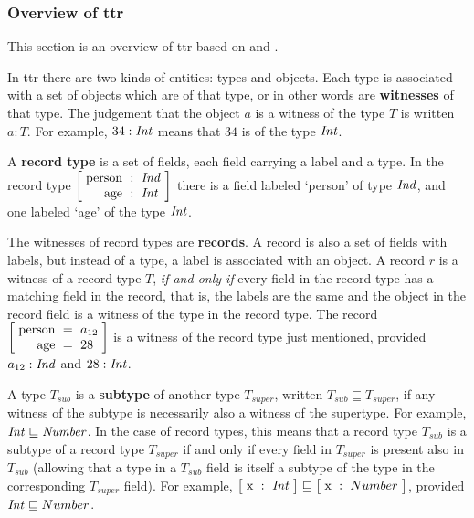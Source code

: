 


\subsubsection{Overview of \gls{ttr}}
\label{sec:ttr}

This section is an overview of \gls{ttr} based on \cite{CooperTypetheorysemantics2012} and \cite{CooperTypetheorylanguage2016}.

In \gls{ttr} there are two kinds of entities: types and objects.
Each type is associated with a set of objects which are of that type, or in other words are \textbf{witnesses} of that type.
The judgement that the object $a$ is a witness of the type $T$ is written $a : T$.
For example, $34 : \mathit{Int}$ means that $34$ is of the type $\mathit{Int}$.

A \textbf{record type} is a set of fields, each field carrying a label and a type.
In the record type $\rec{\text{person} &:& \type{Ind} \\ \text{age} &:& \type{Int}}$ there is a field labeled `person' of type $\mathit{Ind}$, and one labeled `age' of the type $\mathit{Int}$.

The witnesses of record types are \textbf{records}.
A record is also a set of fields with labels, but instead of a type, a label is associated with an object.
A record $r$ is a witness of a record type $T$, \textit{if and only if} every field in the record type has a matching field in the record, that is, the labels are the same and the object in the record field is a witness of the type in the record type.
The record $\rec{\text{person} &=& a_{12} \\ \text{age} &=& 28}$ is a witness of the record type just mentioned, provided $a_{12} : \mathit{Ind}$ and $28 : \mathit{Int}$.


A type $T_{sub}$ is a \textbf{subtype} of another type $T_{super}$, written $T_{sub} \sqsubseteq T_{super}$, if any witness of the subtype is necessarily also a witness of the supertype.
For example, $\mathit{Int} \sqsubseteq \mathit{Number}$.
In the case of record types, this means that a record type $T_{sub}$ is a subtype of a record type $T_{super}$ if and only if every field in $T_{super}$ is present also in $T_{sub}$ (allowing that a type in a $T_{sub}$ field is itself a subtype of the type in the corresponding $T_{super}$ field).
For example, $\rec{\text{x} &:& \type{Int}} \sqsubseteq \rec{\text{x} &:& Number}$, provided $\mathit{Int} \sqsubseteq Number$.

